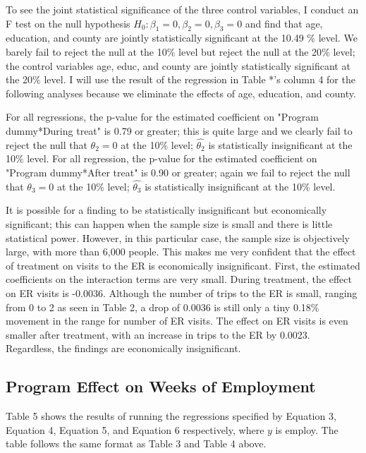 \documentclass[a4paper]{article}
\begin{document}
To see the joint statistical significance of the three control variables, I conduct an F test on the null hypothesis $H_{0}: \beta_{1} = 0, \beta_{2} = 0, \beta_{3} = 0$ and find that age, education, and county are jointly statistically significant at the 10.49 $\%$ level. We barely fail to reject the null at the 10$\%$ level but reject the null at the 20$\%$ level; the control variables age, educ, and county are jointly statistically significant at the 20$\%$ level. I will use the result of the regression in Table *'s column 4 for the following analyses because we eliminate the effects of age, education, and county.

For all regressions, the p-value for the estimated coefficient on "Program dummy*During treat" is 0.79 or greater; this is quite large and we clearly fail to reject the null that $\theta_2 = 0$ at the 10$\%$ level; $\hat{\theta_2}$ is statistically insignificant at the 10$\%$ level. For all regression, the p-value for the estimated coefficient on  "Program dummy*After treat" is 0.90 or greater; again we fail to reject the null that $\theta_3 = 0$ at the 10$\%$ level; $\hat{\theta_3}$ is statistically insignificant at the 10$\%$ level. 

It is possible for a finding to be statistically insignificant but economically significant; this can happen when the sample size is small and there is little statistical power. However, in this particular case, the sample size is objectively large, with more than 6,000 people. This makes me very confident that the effect of treatment on visits to the ER is economically insignificant. First, the estimated coefficients on the interaction terms are very small. During treatment, the effect on ER visits is -0.0036. Although the number of trips to the ER is small, ranging from 0 to 2 as seen in Table 2, a drop of 0.0036 is still only a tiny 0.18$\%$ movement in the range for number of ER visits. The effect on ER visits is even smaller after treatment, with an increase in trips to the ER by 0.0023. Regardless, the findings are economically insignificant.

\subsection{Program Effect on Weeks of Employment}

Table 5 shows the results of running the regressions specified by Equation 3, Equation 4, Equation 5, and Equation 6 respectively, where $y$ is employ. The table follows the same format as Table 3 and Table 4 above. 
\end{document}
